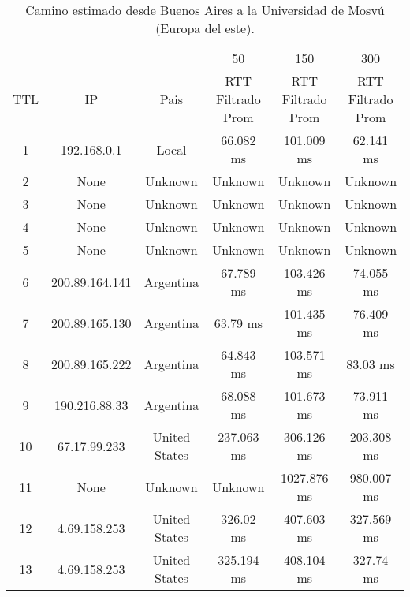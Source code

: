\begin{table}[H]
\centering
\caption{Camino estimado desde Buenos Aires a la Universidad de Mosvú (Europa del este).}
\begin{tabular}{ | c | c | c | c | c | c | }
\hline
 & & & 50 & 150 & 300 \\ %
TTL	&         IP    &     	        Pais     &   	 RTT Filtrado Prom&  	 RTT Filtrado Prom&  	 RTT Filtrado Prom  \\ \hline
1	&192.168.0.1    &     	       Local     &   	      66.082 ms   &  	     101.009 ms   &  	      62.141 ms \\ \hline    
2	&None           &     	      Unknown    &   	      Unknown     &  	      Unknown     &  	      Unknown   \\ \hline    
3	&None           &     	      Unknown    &   	      Unknown     &  	      Unknown     &  	      Unknown   \\ \hline    
4	&None           &     	      Unknown    &   	      Unknown     &  	      Unknown     &  	      Unknown   \\ \hline    
5	&None           &     	      Unknown    &   	      Unknown     &  	      Unknown     &  	      Unknown   \\ \hline    
6	&200.89.164.141 &     	     Argentina   &   	      67.789 ms   &  	     103.426 ms   &  	      74.055 ms \\ \hline    
7	&200.89.165.130 &     	     Argentina   &   	       63.79 ms   &  	     101.435 ms   &  	      76.409 ms \\ \hline    
8	&200.89.165.222 &     	     Argentina   &   	      64.843 ms   &  	     103.571 ms   &  	       83.03 ms \\ \hline    
9	&190.216.88.33  &     	     Argentina   &   	      68.088 ms   &  	     101.673 ms   &  	      73.911 ms \\ \hline    
10	&67.17.99.233   &     	   United States &   	     237.063 ms   &  	     306.126 ms   &  	     203.308 ms \\ \hline    
11	&None           &     	      Unknown    &   	      Unknown     &  	    1027.876 ms   &  	     980.007 ms \\ \hline    
12	&4.69.158.253   &     	   United States &   	      326.02 ms   &  	     407.603 ms   &  	     327.569 ms \\ \hline    
13	&4.69.158.253   &     	   United States &   	     325.194 ms   &  	     408.104 ms   &  	      327.74 ms \\ \hline    

\end{tabular}
\end{table}
